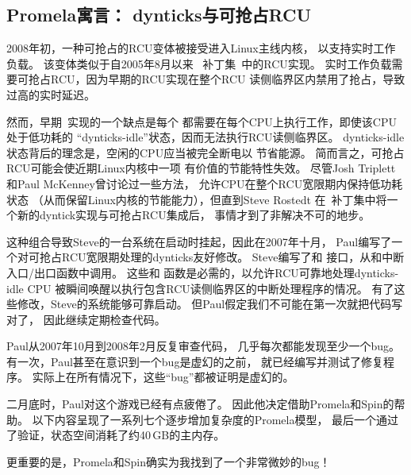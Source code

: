

\subsection{Promela寓言：
			     {dynticks}与可抢占RCU}
\label{sec:formal:Promela Parable: dynticks and Preemptible RCU}

2008年初，一种可抢占的RCU变体被接受进入Linux主线内核，
以支持实时工作负载。
该变体类似于自2005年8月以来
\rt\ 补丁集~\cite{IngoMolnar05a}中的RCU实现。
实时工作负载需要可抢占RCU，因为早期的RCU实现在整个RCU
读侧临界区内禁用了抢占，导致过高的实时延迟。

然而，早期\rt\ 实现的一个缺点是每个
都需要在每个CPU上执行工作，即使该CPU处于低功耗的
``dynticks-idle''状态，因而无法执行RCU读侧临界区。
dynticks-idle状态背后的理念是，空闲的CPU应当被完全断电以
节省能源。
简而言之，可抢占RCU可能会使近期Linux内核中一项
有价值的节能特性失效。
尽管Josh Triplett和Paul McKenney曾讨论过一些方法，
允许CPU在整个RCU宽限期内保持低功耗状态
（从而保留Linux内核的节能能力），但直到Steve Rostedt
在\rt\ 补丁集中将一个新的dyntick实现与可抢占RCU集成后，
事情才到了非解决不可的地步。

这种组合导致Steve的一台系统在启动时挂起，因此在2007年十月，
Paul编写了一个对可抢占RCU宽限期处理的dynticks友好修改。
Steve编写了和
接口，从和中断
入口/出口函数中调用。
这些和
函数是必需的，以允许RCU可靠地处理dynticks-idle CPU
被瞬间唤醒以执行包含RCU读侧临界区的中断处理程序的情况。
有了这些修改，Steve的系统能够可靠启动。
但Paul假定我们不可能在第一次就把代码写对了，
因此继续定期检查代码。

Paul从2007年10月到2008年2月反复审查代码，
几乎每次都能发现至少一个bug。
有一次，Paul甚至在意识到一个bug是虚幻的之前，
就已经编写并测试了修复程序。
实际上在所有情况下，这些``bug''都被证明是虚幻的。

二月底时，Paul对这个游戏已经有点疲倦了。
因此他决定借助Promela和Spin的帮助。
以下内容呈现了一系列七个逐步增加复杂度的Promela模型，
最后一个通过了验证，状态空间消耗了约40\,GB的主内存。

更重要的是，Promela和Spin确实为我找到了一个非常微妙的bug！

